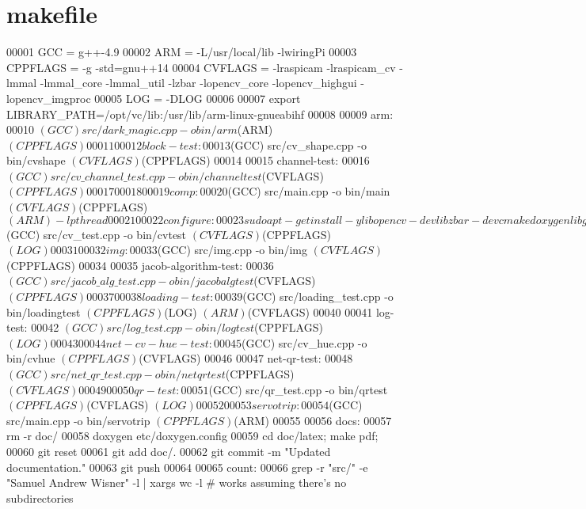 \hypertarget{makefile_source}{\section{makefile}
}

\begin{DoxyCode}
00001 GCC = g++-4.9
00002 ARM = -L/usr/local/lib -lwiringPi
00003 CPPFLAGS = -g -std=gnu++14
00004 CVFLAGS = -lraspicam -lraspicam\_cv -lmmal -lmmal\_core -lmmal\_util -lzbar -lopencv\_core
       -lopencv\_highgui -lopencv\_imgproc
00005 LOG = -DLOG
00006 
00007 export LIBRARY\_PATH=/opt/vc/lib:/usr/lib/arm-linux-gnueabihf
00008 
00009 arm:
00010    $(GCC) src/dark\_magic.cpp -o bin/arm $(ARM) $(CPPFLAGS)
00011 
00012 block-test:
00013    $(GCC) src/cv\_shape.cpp -o bin/cvshape $(CVFLAGS) $(CPPFLAGS)
00014 
00015 channel-test:
00016    $(GCC) src/cv\_channel\_test.cpp -o bin/channeltest $(CVFLAGS) $(CPPFLAGS)
00017 
00018 
00019 comp:
00020    $(GCC) src/main.cpp -o bin/main $(CVFLAGS) $(CPPFLAGS) $(ARM) -lpthread
00021 
00022 configure:
00023    sudo apt-get install -y libopencv-dev libzbar-dev cmake doxygen libgl1-meda-dri
00024    git clone https://github.com/cedricve/raspicam
00025    cd raspicam; mkdir build; cd build; cmake ..; make; sudo make install; sudo ldconfig;
00026    sudo rm -r raspicam
00027    mkdir docs
00028 
00029 cv-test:
00030    $(GCC) src/cv\_test.cpp -o bin/cvtest $(CVFLAGS) $(CPPFLAGS) $(LOG)
00031 
00032 img:
00033    $(GCC) src/img.cpp -o bin/img $(CVFLAGS) $(CPPFLAGS)
00034 
00035 jacob-algorithm-test:
00036    $(GCC) src/jacob\_alg\_test.cpp -o bin/jacobalgtest $(CVFLAGS) $(CPPFLAGS)
00037 
00038 loading-test:
00039    $(GCC) src/loading\_test.cpp -o bin/loadingtest $(CPPFLAGS) $(LOG) $(ARM) $(CVFLAGS)
00040 
00041 log-test:
00042    $(GCC) src/log\_test.cpp -o bin/logtest $(CPPFLAGS) $(LOG)
00043 
00044 net-cv-hue-test:
00045    $(GCC) src/cv\_hue.cpp -o bin/cvhue $(CPPFLAGS) $(CVFLAGS)
00046 
00047 net-qr-test:
00048    $(GCC) src/net\_qr\_test.cpp -o bin/netqrtest $(CPPFLAGS) $(CVFLAGS)
00049 
00050 qr-test:
00051    $(GCC) src/qr\_test.cpp -o bin/qrtest $(CPPFLAGS) $(CVFLAGS) $(LOG)
00052 
00053 servotrip:
00054    $(GCC) src/main.cpp -o bin/servotrip $(CPPFLAGS) $(ARM)
00055 
00056 docs:
00057    rm -r doc/
00058    doxygen etc/doxygen.config
00059    cd doc/latex; make pdf;
00060    git reset
00061    git add doc/.
00062    git commit -m "Updated documentation."
00063    git push
00064 
00065 count:
00066    grep -r "src/" -e "Samuel Andrew Wisner" -l | xargs wc -l  # works assuming there's no
       subdirectories
\end{DoxyCode}
